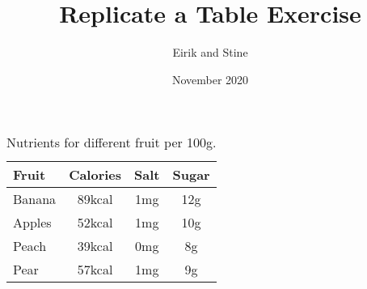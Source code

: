 \documentclass{article}
\title{Replicate a Table Exercise}
\author{Eirik and Stine}
\date{November 2020}
\begin{document}
\maketitle
\begin{table}[h]
    \centering
    \begin{tabular}{l|c c c}
        Fruit & Calories & Salt & Sugar \\
        \hline
         Banana & 89kcal & 1mg & 12g \\
         Apples & 52kcal & 1mg & 10g \\
         Peach  & 39kcal & 0mg & 8g  \\
         Pear   & 57kcal & 1mg & 9g
    \end{tabular}
    \caption{Nutrients for different fruit per 100g.}
\end{table}
\end{document}
